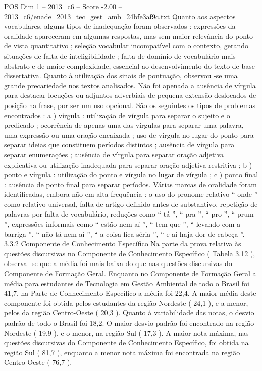 \begin{textsample}{POS Dim 1 – 2013\_c6 – Score -2.00 – 2013\_c6/enade\_2013\_tec\_gest\_amb\_24bfe3af9c.txt}
Quanto aos aspectos vocabulares, alguns tipos de inadequação foram observados : expressões da oralidade apareceram em algumas respostas, mas sem maior relevância do ponto de vista quantitativo ; seleção vocabular incompatível com o contexto, gerando situações de falta de inteligibilidade ; falta de domínio de vocabulário mais abstrato e de maior complexidade, essencial ao desenvolvimento do texto de base dissertativa.
Quanto à utilização dos sinais de pontuação, observou -se uma grande precariedade nos textos analisados.
Não foi apenada a ausência de vírgula para destacar locuções ou adjuntos adverbiais de pequena extensão deslocados de posição na frase, por ser um uso opcional.
São os seguintes os tipos de problemas encontrados : a ) vírgula : utilização de vírgula para separar o sujeito e o predicado ; ocorrência de apenas uma das vírgulas para separar uma palavra, uma expressão ou uma oração encaixada ; uso de vírgula no lugar do ponto para separar ideias que constituem períodos distintos ; ausência de vírgula para separar enumerações ; ausência de vírgula para separar oração adjetiva explicativa ou utilização inadequada para separar oração adjetiva restritiva ; b ) ponto e vírgula : utilização do ponto e vírgula no lugar de vírgula ; c ) ponto final : ausência de ponto final para separar períodos.
Várias marcas de oralidade foram identificadas, embora não em alta frequência : o uso do pronome relativo “ onde ” como relativo universal, falta de artigo definido antes de substantivo, repetição de palavras por falta de vocabulário, reduções como “ tá ”, “ pra ”, “ pro ”, “ prum ”, expressões informais como “ estão nem aí ”, “ tem que ”, “ levando com a barriga ”, “ não tá nem aí ”, “ a coisa fica séria ”, “ e aí haja dor de cabeça ”. 3.3.2 Componente de Conhecimento Específico Na parte da prova relativa às questões discursivas no Componente de Conhecimento Específico ( Tabela 3.12 ), observa -se que a média foi mais baixa do que nas questões discursivas do Componente de Formação Geral.
Enquanto no Componente de Formação Geral a média para estudantes de Tecnologia em Gestão Ambiental de todo o Brasil foi 41,7, na Parte de Conhecimento Específico a média foi 22,4.
A maior média deste componente foi obtida pelos estudantes da região Nordeste ( 24,1 ), e a menor, pelos da região Centro-Oeste ( 20,3 ).
Quanto à variabilidade das notas, o desvio padrão de todo o Brasil foi 18,2.
O maior desvio padrão foi encontrado na região Nordeste ( 19,9 ), e o menor, na região Sul ( 17,3 ).
A maior nota máxima, nas questões discursivas do Componente de Conhecimento Específico, foi obtida na região Sul ( 81,7 ), enquanto a menor nota máxima foi encontrada na região Centro-Oeste ( 76,7 ).

\end{textsample}
